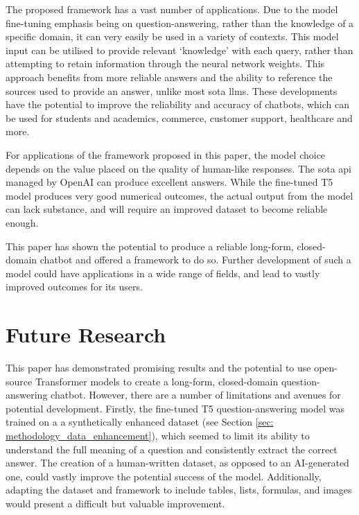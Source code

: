 The proposed framework has a vast number of applications. Due to the model fine-tuning emphasis being on question-answering, rather than the knowledge of a specific domain, it can very easily be used in a variety of contexts. This model input can be utilised to provide relevant `knowledge' with each query, rather than attempting to retain information through the neural network weights. This approach benefits from more reliable answers and the ability to reference the sources used to provide an answer, unlike most \acrlong{sota} \acrshort{llm}s. These developments have the potential to improve the reliability and accuracy of chatbots, which can be used for students and academics, commerce, customer support, healthcare and more.

For applications of the framework proposed in this paper, the model choice depends on the value placed on the quality of human-like responses. The \acrlong{sota} \acrshort{api} managed by OpenAI can produce excellent answers. While the fine-tuned T5 model produces very good numerical outcomes, the actual output from the model can lack substance, and will require an improved dataset to become reliable enough.

This paper has shown the potential to produce a reliable long-form, closed-domain chatbot and offered a framework to do so. Further development of such a model could have applications in a wide range of fields, and lead to vastly improved outcomes for its users.





\section{Future Research}

This paper has demonstrated promising results and the potential to use open-source Transformer models to create a long-form, closed-domain question-answering chatbot. However, there are a number of limitations and avenues for potential development. Firstly, the fine-tuned T5 question-answering model was trained on a a synthetically enhanced dataset (see Section \ref{sec: methodology_data_enhancement}), which seemed to limit its ability to understand the full meaning of a question and consistently extract the correct answer. The creation of a human-written dataset, as opposed to an AI-generated one, could vastly improve the potential success of the model. Additionally, adapting the dataset and framework to include tables, lists, formulas, and images would present a difficult but valuable improvement.


